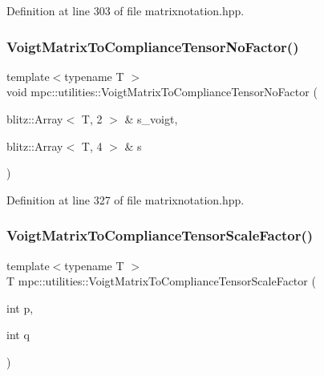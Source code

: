 Definition at line 303 of file matrixnotation.\+hpp.

\mbox{\label{namespacempc_1_1utilities_af0464cc342675cdd798936b674ceb8a9}} 
\subsubsection{\texorpdfstring{Voigt\+Matrix\+To\+Compliance\+Tensor\+No\+Factor()}{VoigtMatrixToComplianceTensorNoFactor()}}
{\footnotesize\ttfamily template$<$typename T $>$ \\
void mpc\+::utilities\+::\+Voigt\+Matrix\+To\+Compliance\+Tensor\+No\+Factor (\begin{DoxyParamCaption}\item[{blitz\+::\+Array$<$ T, 2 $>$ \&}]{s\+\_\+voigt,  }\item[{blitz\+::\+Array$<$ T, 4 $>$ \&}]{s }\end{DoxyParamCaption})}



Definition at line 327 of file matrixnotation.\+hpp.

\mbox{\label{namespacempc_1_1utilities_afd7cbb4c9bcff1896e7151eae95369ae}} 
\subsubsection{\texorpdfstring{Voigt\+Matrix\+To\+Compliance\+Tensor\+Scale\+Factor()}{VoigtMatrixToComplianceTensorScaleFactor()}}
{\footnotesize\ttfamily template$<$typename T $>$ \\
T mpc\+::utilities\+::\+Voigt\+Matrix\+To\+Compliance\+Tensor\+Scale\+Factor (\begin{DoxyParamCaption}\item[{int}]{p,  }\item[{int}]{q }\end{DoxyParamCaption})}



